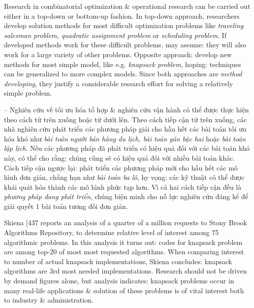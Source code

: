 \documentclass{article}
\begin{document}
\begin{itemize}
\begin{itemize}
        Research in combinatorial optimization \& operational research can be carried out either in a top-down or bottom-up fashion. In top-down approach, researchers develop solution methods for most difficult optimization problems like {\it traveling salesman problem, quadratic assignment problem} or {\it scheduling problem}. If developed methods work for these difficult problems, may assume: they will also work for a large variety of other problems. Opposite approach: develop new methods for most simple model, like e.g. {\it knapsack problem}, hoping: techniques can be generalized to more complex models. Since both approaches are {\it method developing}, they justify a considerable research effort for solving a relatively simple problem.

        -- Nghiên cứu về tối ưu hóa tổ hợp \& nghiên cứu vận hành có thể được thực hiện theo cách từ trên xuống hoặc từ dưới lên. Theo cách tiếp cận từ trên xuống, các nhà nghiên cứu phát triển các phương pháp giải cho hầu hết các bài toán tối ưu hóa khó như {\it bài toán người bán hàng du lịch, bài toán gán bậc hai} hoặc {\it bài toán lập lịch}. Nếu các phương pháp đã phát triển có hiệu quả đối với các bài toán khó này, có thể cho rằng: chúng cũng sẽ có hiệu quả đối với nhiều bài toán khác. Cách tiếp cận ngược lại: phát triển các phương pháp mới cho hầu hết các mô hình đơn giản, chẳng hạn như {\it bài toán ba lô}, hy vọng: các kỹ thuật có thể được khái quát hóa thành các mô hình phức tạp hơn. Vì cả hai cách tiếp cận đều là {\it phương pháp đang phát triển}, chúng biện minh cho nỗ lực nghiên cứu đáng kể để giải quyết 1 bài toán tương đối đơn giản.


        {\sc Skiena} [437 reports an analysis of a quarter of a million requests to Stony Brook Algorithms Repository, to determine relative level of interest among 75 algorithmic problems. In this analysis it turns out: codes for knapsack problem are among top-20 of most most requested algorithms. When comparing interest to number of actual knapsack implementations, {\sc Skiena} concludes: knapsack algorithms are 3rd most needed implementations. Research should not be driven by demand figures alone, but analysis indicates: knapsack problems occur in many real-life applications \& solution of these problems is of vital interest both to industry \& administration.


\end{itemize}
\end{itemize}
\end{document}
